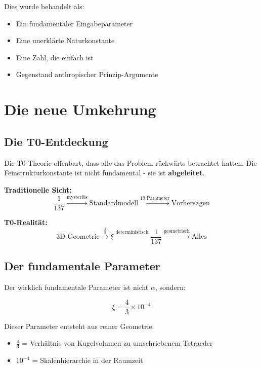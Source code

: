 \documentclass[12pt,a4paper]{article}
\theoremstyle{definition}
\begin{document}
	Dies wurde behandelt als:
	\begin{itemize}
		\item Ein fundamentaler Eingabeparameter
		\item Eine unerklärte Naturkonstante
		\item Eine Zahl, die einfach ist
		\item Gegenstand anthropischer Prinzip-Argumente
	\end{itemize}
	
	\section{Die neue Umkehrung}
	
	\subsection{Die T0-Entdeckung}
	
	Die T0-Theorie offenbart, dass alle das Problem rückwärts betrachtet hatten. Die Feinstrukturkonstante ist nicht fundamental - sie ist \textbf{abgeleitet}.
	
	\begin{neueperspektive}
		\textbf{Traditionelle Sicht:}
		\begin{equation}
			\frac{1}{137} \xrightarrow{\text{mysteriös}} \text{Standardmodell} \xrightarrow{\text{19 Parameter}} \text{Vorhersagen}
		\end{equation}
		
		\textbf{T0-Realität:}
		\begin{equation}
			\text{3D-Geometrie} \xrightarrow{\frac{4}{3}} \xi \xrightarrow{\text{deterministisch}} \frac{1}{137} \xrightarrow{\text{geometrisch}} \text{Alles}
		\end{equation}
	\end{neueperspektive}
	
	\subsection{Der fundamentale Parameter}
	
	Der wirklich fundamentale Parameter ist nicht $\alpha$, sondern:
	
	\begin{equation}
		\boxed{\xi = \frac{4}{3} \times 10^{-4}}
	\end{equation}
	
	Dieser Parameter entsteht aus reiner Geometrie:
	\begin{itemize}
		\item $\frac{4}{3}$ = Verhältnis von Kugelvolumen zu umschriebenem Tetraeder
		\item $10^{-4}$ = Skalenhierarchie in der Raumzeit
	\end{itemize}
	
\end{document}
